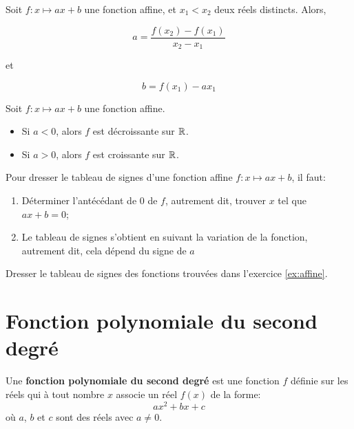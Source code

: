 \documentclass{poly}
\begin{document}
\begin{proposition}
Soit $f : x \mapsto ax + b$ une fonction affine, et $x_1 < x_2$ deux réels distincts. Alors,

\noindent\begin{minipage}{0.5\textwidth}
\begin{equation*}
a = \dfrac{f(x_2) - f(x_1)}{x_2 - x_1}
\end{equation*}
\end{minipage}
et
\begin{minipage}{0.5\textwidth}
\begin{equation*}
b = f(x_1) - ax_1
\end{equation*}
\end{minipage}
\end{proposition}
\begin{proposition}
Soit $f : x \mapsto ax + b$ une fonction affine.
\begin{itemize}
\item Si $a < 0$, alors $f$ est décroissante sur $\mathbb{R}$. 
\item Si $a > 0$, alors $f$ est croissante sur $\mathbb{R}$. 
\end{itemize}
\end{proposition}
\begin{method}
Pour dresser le tableau de signes d'une fonction affine $f : x \mapsto ax + b$, il faut:
\begin{enumerate}
\item Déterminer l'antécédant de $0$ de $f$, autrement dit, trouver $x$ tel que $ax + b = 0$;
\item Le tableau de signes s'obtient en suivant la variation de la fonction, autrement dit, cela dépend du signe de $a$ 
\end{enumerate} 
\end{method}
\begin{exercize}
Dresser le tableau de signes des fonctions trouvées dans l'exercice \ref{ex:affine}.
\end{exercize}

\newpage
\section{Fonction polynomiale du second degré}

\begin{definition}
Une \textbf{fonction polynomiale du second degré} est une fonction $f$ définie sur les réels qui à tout nombre $x$ associe un réel $f(x)$ de la forme:
\begin{equation*}
ax^2+bx+c   
\end{equation*}
où $a$, $b$ et $c$ sont des réels avec $a \neq 0$. 
\end{definition}
\end{document}
